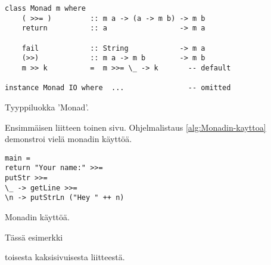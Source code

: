 \documentclass[language=finnish,version=final,mainfont=none,sharelatex=false]{utuftthesis}
\begin{document}
\begin{algorithm}[tbh]
\begin{verbatim}
class Monad m where
    ( >>= )         :: m a -> (a -> m b) -> m b
    return          :: a                 -> m a

    fail            :: String            -> m a
    (>>)            :: m a -> m b        -> m b
    m >> k          =  m >>= \_ -> k       -- default

instance Monad IO where  ...               -- omitted
\end{verbatim}

\caption{Tyyppiluokka 'Monad'.\label{alg:Tyyppiluokka-Monad}}
\end{algorithm}

\newpage{}

Ensimmäisen liitteen toinen sivu. Ohjelmalistaus \ref{alg:Monadin-kayttoa}
demonstroi vielä monadin käyttöä.

\begin{algorithm}[tbh]
\begin{verbatim}
main =
return "Your name:" >>=
putStr >>=
\_ -> getLine >>=
\n -> putStrLn ("Hey " ++ n)
\end{verbatim}

\caption{Monadin käyttöä.\label{alg:Monadin-kayttoa}}
\end{algorithm}



Tässä esimerkki\pagebreak{}

toisesta kaksisivuisesta liitteestä.
\end{document}

